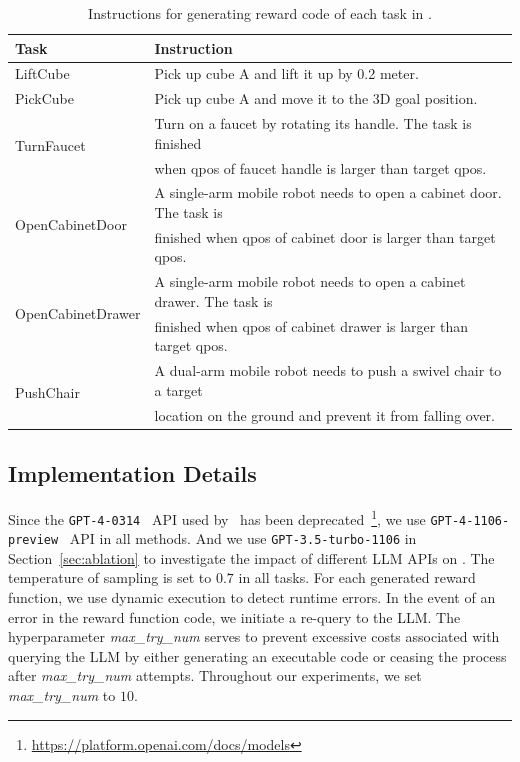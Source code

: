 \documentclass{article}
\theoremstyle{plain}
\theoremstyle{definition}
\theoremstyle{remark}
\begin{document}
\begin{table}[!ht]
\centering
\caption{Instructions for generating reward code of each task in \MS.}
\begin{tabular}{ll}
\toprule
    \textbf{Task} & \textbf{Instruction} \\
\midrule
    LiftCube & Pick up cube A and lift it up by 0.2 meter. \\
    PickCube & Pick up cube A and move it to the 3D goal position. \\
    \multirow{2}{*}{TurnFaucet} & Turn on a faucet by rotating its handle. The task is finished \\
    & when qpos of faucet handle is larger than target qpos. \\
    \multirow{2}{*}{OpenCabinetDoor} & A single-arm mobile robot needs to open a cabinet door. The task is \\
    & finished when qpos of cabinet door is larger than target qpos. \\
    \multirow{2}{*}{OpenCabinetDrawer} & A single-arm mobile robot needs to open a cabinet drawer. The task is \\
    & finished when qpos of cabinet drawer is larger than target qpos. \\
    \multirow{2}{*}{PushChair} & A dual-arm mobile robot needs to push a swivel chair to a target \\
    & location on the ground and prevent it from falling over. \\
\bottomrule
\end{tabular}
\label{tab:maniskill_tasks}
\end{table}


\subsection{Implementation Details}\label{app:implementation_details}

Since the \texttt{GPT-4-0314}~\cite{GPT-4} API used by~\cite{Text2Reward} has been deprecated~\footnote{\url{https://platform.openai.com/docs/models}}, we use \texttt{GPT-4-1106-preview}~\cite{GPT-4} API in all methods. And we use \texttt{GPT-3.5-turbo-1106} in Section~\ref{sec:ablation} to investigate the impact of different LLM APIs on \ourmethod. The temperature of sampling is set to $0.7$ in all tasks. For each generated reward function, we use dynamic execution to detect runtime errors. In the event of an error in the reward function code, we initiate a re-query to the LLM. The hyperparameter \textit{max\_try\_num} serves to prevent excessive costs associated with querying the LLM by either generating an executable code or ceasing the process after \textit{max\_try\_num} attempts. Throughout our experiments, we set \textit{max\_try\_num} to $10$.
\end{document}
